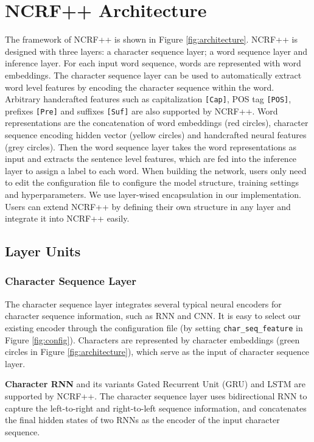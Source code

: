 \documentclass[11pt,a4paper]{article}
\begin{document}
\section{NCRF++ Architecture}
The framework of NCRF++ is shown in Figure \ref{fig:architecture}. NCRF++ is designed with three layers: a character sequence layer; a word sequence layer and inference layer. For each input word sequence, words are represented with word embeddings. The character sequence layer can be used to automatically extract word level features by encoding the character sequence within the word. Arbitrary handcrafted features such as capitalization \texttt{[Cap]}, POS tag \texttt{[POS]}, prefixes \texttt{[Pre]} and suffixes \texttt{[Suf]} are also supported by NCRF++. Word representations are the concatenation of word embeddings (red circles), character sequence encoding hidden vector (yellow circles) and handcrafted neural features (grey circles). Then the word sequence layer takes the word representations as input and extracts the sentence level features, which are fed into the inference layer to assign a label to each word. When building the network, users only need to edit the configuration file to configure the model structure, training settings and hyperparameters. We use layer-wised encapsulation in our implementation. Users can extend NCRF++ by defining their own structure in any layer and integrate it into NCRF++ easily.

\subsection{Layer Units} \label{ssec:layers}
\subsubsection{Character Sequence Layer}
The character sequence layer integrates several typical neural encoders for character sequence information, such as RNN and CNN. It is easy to select our existing encoder through the configuration file (by setting \texttt{char\_seq\_feature} in Figure \ref{fig:config}). Characters are represented by character embeddings (green circles in Figure \ref{fig:architecture}), which serve as the input of character sequence layer.

\noindent \textbullet  \textbf{Character RNN} and its variants Gated Recurrent Unit (GRU) and LSTM are supported by NCRF++. The character sequence layer uses bidirectional RNN to capture the left-to-right and right-to-left sequence information, and concatenates the final hidden states of two RNNs as the encoder of the input character sequence.
\end{document}
